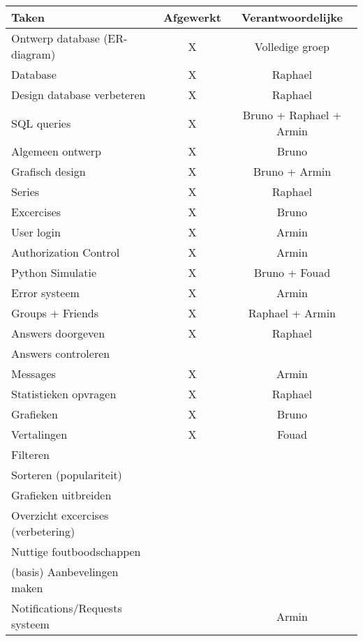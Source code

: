 \begin{tabular}{| l | c | c |}
    \hline
    Taken   &   Afgewerkt   &   Verantwoordelijke \\
    \hline \hline
    Ontwerp database (ER-diagram)   &   X   &   Volledige groep \\
    Database                &   X   &   Raphael \\
    Design database verbeteren  &   X   &   Raphael \\
    SQL queries             &   X   &   Bruno + Raphael + Armin \\
    Algemeen ontwerp        &   X   &   Bruno   \\
    Grafisch design         &   X   &   Bruno + Armin  \\
    Series                  &   X   &   Raphael \\
    Excercises              &   X   &   Bruno   \\
    User login              &   X   &   Armin   \\
    Authorization Control   &   X   &   Armin   \\
    Python Simulatie        &   X   &   Bruno + Fouad   \\
    Error systeem           &   X   &   Armin \\
    Groups + Friends        &   X   &   Raphael + Armin    \\
    Answers doorgeven       &   X   &   Raphael \\
    Answers controleren     &       &       \\
    Messages                &   X   &   Armin   \\
    Statistieken opvragen   &   X   &   Raphael \\
    Grafieken               &   X   &   Bruno   \\
    Vertalingen             &   X   &   Fouad   \\
    Filteren                &       &       \\
    Sorteren (populariteit) &       &       \\
    Grafieken uitbreiden    &       &       \\
    Overzicht excercises (verbetering)  &       &       \\
    Nuttige foutboodschappen    &       &       \\
    (basis) Aanbevelingen maken &       &       \\
    Notifications/Requests systeem &    & Armin \\
    \hline
\end{tabular}